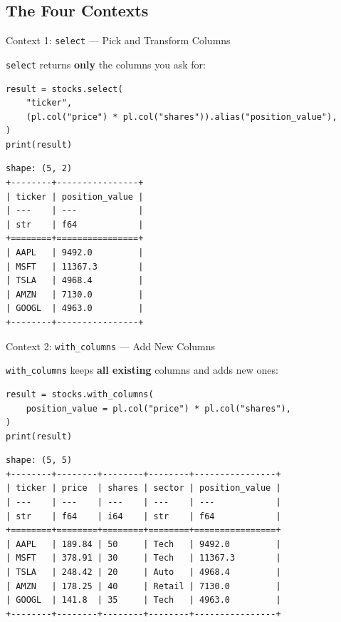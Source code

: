 \documentclass[9pt,aspectratio=169]{beamer}
\newcommand{\py}[1]{\lstinline[language=Python]{#1}}
\begin{document}
\subsection{The Four Contexts}
\begin{frame}[fragile]{Context 1: \texttt{select} --- Pick and Transform Columns}

\py{select} returns \textbf{only} the columns you ask for:

\begin{lstlisting}
result = stocks.select(
    "ticker",
    (pl.col("price") * pl.col("shares")).alias("position_value"),
)
print(result)
\end{lstlisting}

\begin{lstlisting}[style=output]
shape: (5, 2)
+--------+----------------+
| ticker | position_value |
| ---    | ---            |
| str    | f64            |
+========+================+
| AAPL   | 9492.0         |
| MSFT   | 11367.3        |
| TSLA   | 4968.4         |
| AMZN   | 7130.0         |
| GOOGL  | 4963.0         |
+--------+----------------+
\end{lstlisting}

\end{frame}


\begin{frame}[fragile]{Context 2: \texttt{with\_columns} --- Add New Columns}

\py{with_columns} keeps \textbf{all existing} columns and adds new ones:

\begin{lstlisting}
result = stocks.with_columns(
    position_value = pl.col("price") * pl.col("shares"),
)
print(result)
\end{lstlisting}

\begin{lstlisting}[style=output]
shape: (5, 5)
+--------+--------+--------+--------+----------------+
| ticker | price  | shares | sector | position_value |
| ---    | ---    | ---    | ---    | ---            |
| str    | f64    | i64    | str    | f64            |
+========+========+========+========+================+
| AAPL   | 189.84 | 50     | Tech   | 9492.0         |
| MSFT   | 378.91 | 30     | Tech   | 11367.3        |
| TSLA   | 248.42 | 20     | Auto   | 4968.4         |
| AMZN   | 178.25 | 40     | Retail | 7130.0         |
| GOOGL  | 141.8  | 35     | Tech   | 4963.0         |
+--------+--------+--------+--------+----------------+
\end{lstlisting}

\end{frame}
\end{document}
